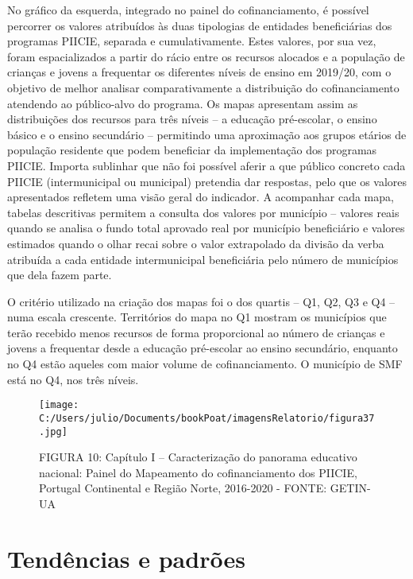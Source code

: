 \documentclass[
]{book}
\begin{document}
No gráfico da esquerda, integrado no painel do cofinanciamento, é possível percorrer os valores atribuídos às duas tipologias de entidades beneficiárias dos programas PIICIE, separada e cumulativamente. Estes valores, por sua vez, foram espacializados a partir do rácio entre os recursos alocados e a população de crianças e jovens a frequentar os diferentes níveis de ensino em 2019/20, com o objetivo de melhor analisar comparativamente a distribuição do cofinanciamento atendendo ao público-alvo do programa. Os mapas apresentam assim as distribuições dos recursos para três níveis -- a educação pré-escolar, o ensino básico e o ensino secundário -- permitindo uma aproximação aos grupos etários de população residente que podem beneficiar da implementação dos programas PIICIE. Importa sublinhar que não foi possível aferir a que público concreto cada PIICIE (intermunicipal ou municipal) pretendia dar respostas, pelo que os valores apresentados refletem uma visão geral do indicador. A acompanhar cada mapa, tabelas descritivas permitem a consulta dos valores por município -- valores reais quando se analisa o fundo total aprovado real por município beneficiário e valores estimados quando o olhar recai sobre o valor extrapolado da divisão da verba atribuída a cada entidade intermunicipal beneficiária pelo número de municípios que dela fazem parte.

O critério utilizado na criação dos mapas foi o dos quartis -- Q1, Q2, Q3 e Q4 -- numa escala crescente. Territórios do mapa no Q1 mostram os municípios que terão recebido menos recursos de forma proporcional ao número de crianças e jovens a frequentar desde a educação pré-escolar ao ensino secundário, enquanto no Q4 estão aqueles com maior volume de cofinanciamento. O município de SMF está no Q4, nos três níveis.

\begin{figure}
\centering
\texttt{[image: C:/Users/julio/Documents/bookPoat/imagensRelatorio/figura37.jpg]}
\caption{FIGURA 10: Capítulo I -- Caracterização do panorama educativo nacional: Painel do Mapeamento do cofinanciamento dos PIICIE, Portugal Continental e Região Norte, 2016-2020 - FONTE: GETIN-UA}
\end{figure}

\hypertarget{tenduxeancias-e-padruxf5es}{%
\section{\texorpdfstring{\textbf{Tendências e padrões}}{Tendências e padrões}}\label{tenduxeancias-e-padruxf5es}}
\end{document}
